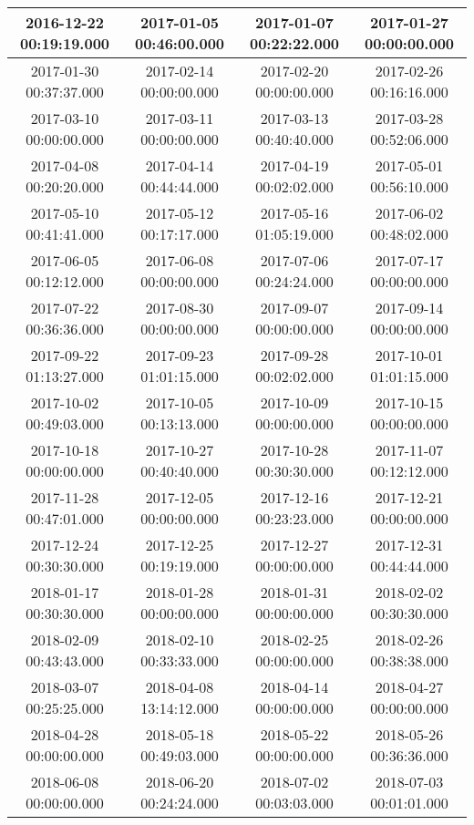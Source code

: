 \begin{longtable}{c c c c}
2016-12-22 00:19:19.000 & 
2017-01-05 00:46:00.000 & 
2017-01-07 00:22:22.000 & 
2017-01-27 00:00:00.000 \\ \midrule
2017-01-30 00:37:37.000 & 
2017-02-14 00:00:00.000 & 
2017-02-20 00:00:00.000 & 
2017-02-26 00:16:16.000 \\ \midrule
2017-03-10 00:00:00.000 & 
2017-03-11 00:00:00.000 & 
2017-03-13 00:40:40.000 & 
2017-03-28 00:52:06.000 \\ \midrule
2017-04-08 00:20:20.000 & 
2017-04-14 00:44:44.000 & 
2017-04-19 00:02:02.000 & 
2017-05-01 00:56:10.000 \\ \midrule
2017-05-10 00:41:41.000 & 
2017-05-12 00:17:17.000 & 
2017-05-16 01:05:19.000 & 
2017-06-02 00:48:02.000 \\ \midrule
2017-06-05 00:12:12.000 & 
2017-06-08 00:00:00.000 & 
2017-07-06 00:24:24.000 & 
2017-07-17 00:00:00.000 \\ \midrule
2017-07-22 00:36:36.000 & 
2017-08-30 00:00:00.000 & 
2017-09-07 00:00:00.000 & 
2017-09-14 00:00:00.000 \\ \midrule
2017-09-22 01:13:27.000 & 
2017-09-23 01:01:15.000 & 
2017-09-28 00:02:02.000 & 
2017-10-01 01:01:15.000 \\ \midrule
2017-10-02 00:49:03.000 & 
2017-10-05 00:13:13.000 & 
2017-10-09 00:00:00.000 & 
2017-10-15 00:00:00.000 \\ \midrule
2017-10-18 00:00:00.000 & 
2017-10-27 00:40:40.000 & 
2017-10-28 00:30:30.000 & 
2017-11-07 00:12:12.000 \\ \midrule
2017-11-28 00:47:01.000 & 
2017-12-05 00:00:00.000 & 
2017-12-16 00:23:23.000 & 
2017-12-21 00:00:00.000 \\ \midrule
2017-12-24 00:30:30.000 & 
2017-12-25 00:19:19.000 & 
2017-12-27 00:00:00.000 & 
2017-12-31 00:44:44.000 \\ \midrule
2018-01-17 00:30:30.000 & 
2018-01-28 00:00:00.000 & 
2018-01-31 00:00:00.000 & 
2018-02-02 00:30:30.000 \\ \midrule
2018-02-09 00:43:43.000 & 
2018-02-10 00:33:33.000 & 
2018-02-25 00:00:00.000 & 
2018-02-26 00:38:38.000 \\ \midrule
2018-03-07 00:25:25.000 & 
2018-04-08 13:14:12.000 & 
2018-04-14 00:00:00.000 & 
2018-04-27 00:00:00.000 \\ \midrule
2018-04-28 00:00:00.000 & 
2018-05-18 00:49:03.000 & 
2018-05-22 00:00:00.000 & 
2018-05-26 00:36:36.000 \\ \midrule
2018-06-08 00:00:00.000 & 
2018-06-20 00:24:24.000 & 
2018-07-02 00:03:03.000 & 
2018-07-03 00:01:01.000 \\ \midrule

\end{longtable}
